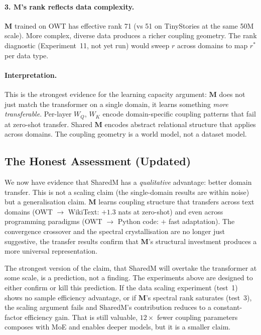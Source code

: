 \documentclass[11pt, a4paper]{article}
\newcommand{\M}{\mathbf{M}}
\theoremstyle{remark}
\begin{document}
\paragraph{3. $\M$'s rank reflects data complexity.}
$\M$ trained on OWT has effective rank 71 (vs 51 on TinyStories at the same 50M scale).
More complex, diverse data produces a richer coupling geometry.
The rank diagnostic (Experiment~11, not yet run) would sweep $r$ across domains to map $r^*$ per data type.

\paragraph{Interpretation.}
This is the strongest evidence for the learning capacity argument: $\M$ does not just match the transformer on a single domain, it learns something \emph{more transferable}.
Per-layer $W_Q$, $W_K$ encode domain-specific coupling patterns that fail at zero-shot transfer.
Shared $\M$ encodes abstract relational structure that applies across domains.
The coupling geometry is a world model, not a dataset model.

\subsection{The Honest Assessment (Updated)}

We now have evidence that SharedM has a \emph{qualitative} advantage: better domain transfer.
This is not a scaling claim (the single-domain results are within noise) but a generalisation claim.
$\M$ learns coupling structure that transfers across text domains (OWT $\to$ WikiText: $+1.3$ nats at zero-shot) and even across programming paradigms (OWT $\to$ Python code: $+$ fast adaptation).
The convergence crossover and the spectral crystallisation are no longer just suggestive, the transfer results confirm that $\M$'s structural investment produces a more universal representation.

The strongest version of the claim, that SharedM will overtake the transformer at some scale, is a prediction, not a finding.
The experiments above are designed to either confirm or kill this prediction.
If the data scaling experiment (test~1) shows no sample efficiency advantage, or if $\M$'s spectral rank saturates (test~3), the scaling argument fails and SharedM's contribution reduces to a constant-factor efficiency gain.
That is still valuable, $12\times$ fewer coupling parameters composes with MoE and enables deeper models, but it is a smaller claim.
\end{document}
